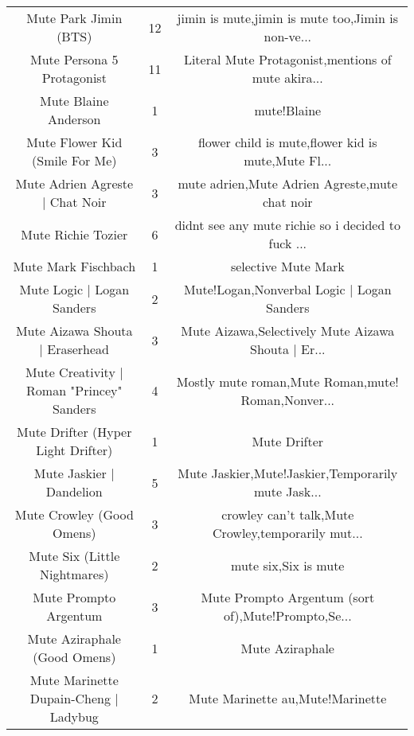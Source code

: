 \begin{table}[h!]
{\begin{tabular}{|c|c|c|}
                             Mute Park Jimin (BTS) &     12 & jimin is mute,jimin is mute too,Jimin is non-ve... \\
                        Mute Persona 5 Protagonist &     11 & Literal Mute Protagonist,mentions of mute akira... \\
                              Mute Blaine Anderson &      1 &                                        mute!Blaine \\
                    Mute Flower Kid (Smile For Me) &      3 & flower child is mute,flower kid is mute,Mute Fl... \\
                   Mute Adrien Agreste | Chat Noir &      3 &     mute adrien,Mute Adrien Agreste,mute chat noir \\
                                Mute Richie Tozier &      6 & didnt see any mute richie so i decided to fuck ... \\
                               Mute Mark Fischbach &      1 &                                selective Mute Mark \\
                        Mute Logic | Logan Sanders &      2 &         Mute!Logan,Nonverbal Logic | Logan Sanders \\
                   Mute Aizawa Shouta | Eraserhead &      3 & Mute Aizawa,Selectively Mute Aizawa Shouta | Er... \\
         Mute Creativity | Roman "Princey" Sanders &      4 & Mostly mute roman,Mute Roman,mute! Roman,Nonver... \\
                Mute Drifter (Hyper Light Drifter) &      1 &                                       Mute Drifter \\
                          Mute Jaskier | Dandelion &      5 & Mute Jaskier,Mute!Jaskier,Temporarily mute Jask... \\
                         Mute Crowley (Good Omens) &      3 & crowley can't talk,Mute Crowley,temporarily mut... \\
                      Mute Six (Little Nightmares) &      2 &                               mute six,Six is mute \\
                             Mute Prompto Argentum &      3 & Mute Prompto Argentum (sort of),Mute!Prompto,Se... \\
                      Mute Aziraphale (Good Omens) &      1 &                                    Mute Aziraphale \\
             Mute Marinette Dupain-Cheng | Ladybug &      2 &                   Mute Marinette au,Mute!Marinette \\

\end{tabular}}
\end{table}
